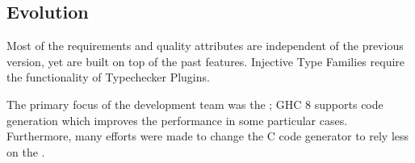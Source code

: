 
\subsection{Evolution}

Most of the requirements and quality attributes are independent of the previous version, yet are built on top of the past features. Injective Type Families require the functionality of Typechecker Plugins. 

The primary focus of the development team was the ; GHC 8 supports  code generation which improves the performance in some particular cases. Furthermore, many efforts were made to change the C code generator to rely less on the .